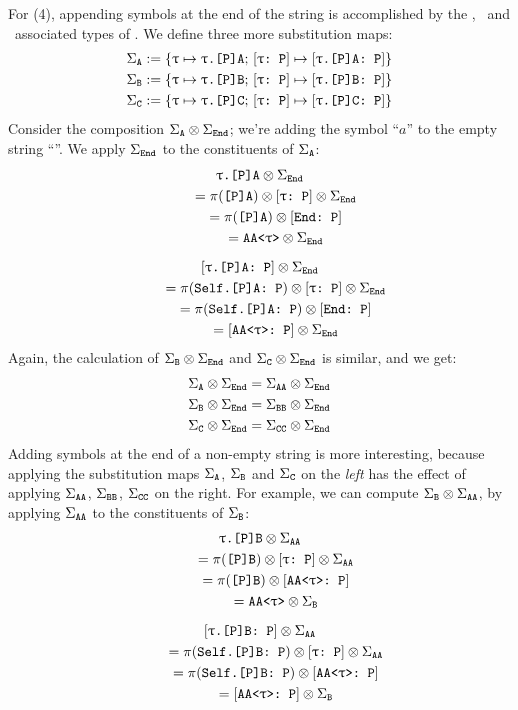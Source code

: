 \documentclass[../generics]{subfiles}
\begin{document}
For (4), appending symbols at the end of the string is accomplished by the \nA, \nB\ and \nC\ associated types of \tP. We define three more substitution maps:
\begin{gather*}
\Sigma_{\texttt{A}} := \{\texttt{$\uptau$} \mapsto \texttt{$\uptau$.[P]A};\,[\texttt{$\uptau$:~P}] \mapsto [\texttt{$\uptau$.[P]A:~P}]\}\\
\Sigma_{\texttt{B}} := \{\texttt{$\uptau$} \mapsto \texttt{$\uptau$.[P]B};\,[\texttt{$\uptau$:~P}] \mapsto [\texttt{$\uptau$.[P]B:~P}]\}\\
\Sigma_{\texttt{C}} := \{\texttt{$\uptau$} \mapsto \texttt{$\uptau$.[P]C};\,[\texttt{$\uptau$:~P}] \mapsto [\texttt{$\uptau$.[P]C:~P}]\}
\end{gather*}
Consider the composition $\Sigma_{\texttt{A}}\otimes\Sigma_{\texttt{End}}$; we're adding the symbol ``$a$'' to the empty string ``''. We apply $\Sigma_{\texttt{End}}$ to the constituents of $\Sigma_{\texttt{A}}$:
\begin{gather*}
\texttt{$\uptau$.[P]A} \otimes \Sigma_{\texttt{End}}\\
\qquad {} = \pi(\texttt{[P]A}) \otimes [\texttt{$\uptau$:~P}] \otimes \Sigma_{\texttt{End}}\\
\qquad {} = \pi(\texttt{[P]A}) \otimes [\texttt{End:~P}]\\
\qquad {} = \texttt{AA<$\uptau$>} \otimes \Sigma_{\texttt{End}}\\[\medskipamount]
[\texttt{$\uptau$.[P]A:~P}] \otimes \Sigma_{\texttt{End}}\\
\qquad {} = \pi(\texttt{Self.[P]A:~P}) \otimes [\texttt{$\uptau$:~P}] \otimes \Sigma_{\texttt{End}}\\
\qquad {} = \pi(\texttt{Self.[P]A:~P}) \otimes [\texttt{End:~P}]\\
\qquad {} = [\texttt{AA<$\uptau$>:~P}] \otimes \Sigma_{\texttt{End}}
\end{gather*}
Again, the calculation of $\Sigma_{\texttt{B}}\otimes\Sigma_{\texttt{End}}$ and $\Sigma_{\texttt{C}}\otimes\Sigma_{\texttt{End}}$ is similar, and we get:
\begin{gather*}
\Sigma_{\texttt{A}}\otimes\Sigma_{\texttt{End}}=\Sigma_{\texttt{AA}}\otimes\Sigma_{\texttt{End}}\\
\Sigma_{\texttt{B}}\otimes\Sigma_{\texttt{End}}=\Sigma_{\texttt{BB}}\otimes\Sigma_{\texttt{End}}\\
\Sigma_{\texttt{C}}\otimes\Sigma_{\texttt{End}}=\Sigma_{\texttt{CC}}\otimes\Sigma_{\texttt{End}}
\end{gather*}
Adding symbols at the end of a non-empty string is more interesting, because applying the substitution maps $\Sigma_{\texttt{A}}$, $\Sigma_{\texttt{B}}$ and $\Sigma_{\texttt{C}}$ on the \emph{left} has the effect of applying $\Sigma_{\texttt{AA}}$, $\Sigma_{\texttt{BB}}$, $\Sigma_{\texttt{CC}}$ on the right. For example, we can compute $\Sigma_{\texttt{B}}\otimes\Sigma_{\texttt{AA}}$, by applying $\Sigma_{\texttt{AA}}$ to the constituents of $\Sigma_{\texttt{B}}$:
\begin{gather*}
\texttt{$\uptau$.[P]B} \otimes \Sigma_{\texttt{AA}}\\
\qquad {} = \pi(\texttt{[P]B}) \otimes [\texttt{$\uptau$:~P}] \otimes \Sigma_{\texttt{AA}}\\
\qquad {} = \pi(\texttt{[P]B}) \otimes [\texttt{AA<$\uptau$>:~P}]\\
\qquad {} = \texttt{AA<$\uptau$>} \otimes \Sigma_{\texttt{B}}\\[\medskipamount]
[\texttt{$\uptau$.[P]B:~P}] \otimes \Sigma_{\texttt{AA}}\\
\qquad {} = \pi(\texttt{Self.[P]B:~P}) \otimes [\texttt{$\uptau$:~P}] \otimes \Sigma_{\texttt{AA}}\\
\qquad {} = \pi(\texttt{Self.[P]B:~P}) \otimes [\texttt{AA<$\uptau$>:~P}]\\
\qquad {} = [\texttt{AA<$\uptau$>:~P}] \otimes \Sigma_{\texttt{B}}
\end{gather*}
\end{document}
